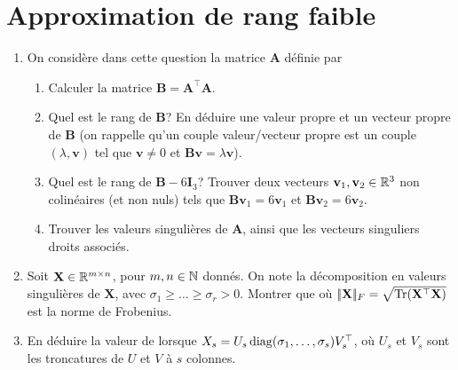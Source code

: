 \section{Approximation de rang faible}
\begin{enumerate}
	
	
	
	\item On considère dans cette question la matrice $\mathbf{A}$ définie par
	\begin{enumerate}
		\item Calculer la matrice $\mathbf{B} = \mathbf{A}^\top \mathbf{A}$.
		\item Quel est le rang de $\mathbf{B}$? En déduire une valeur propre et un vecteur propre de $\mathbf{B}$ (on rappelle qu'un couple valeur/vecteur propre est un couple $(\lambda,\mathbf{v})$ tel que $\mathbf{v}\neq 0$ et $\mathbf{B}\mathbf{v} = \lambda \mathbf{v}$).
		\item Quel est le rang de $\mathbf{B}-6\mathbf{I}_3$? Trouver deux vecteurs $\mathbf{v}_1,\mathbf{v}_2 \in \mathbb{R}^3$ non colinéaires (et non nuls) tels que $\mathbf{B}\mathbf{v}_1=6\mathbf{v}_1$ et $\mathbf{B}\mathbf{v}_2=6\mathbf{v}_2$.
		\item Trouver les valeurs singulières de $\mathbf{A}$, ainsi que les vecteurs singuliers droits associés.
	\end{enumerate}
	
	\item Soit $\mathbf{X} \in \mathbb{R}^{m\times n}$, pour $m,n \in \mathbb{N}$ donnés. On note
	la décomposition en valeurs singulières de $\mathbf{X}$, avec $\sigma_1 \geq \ldots \geq \sigma_r > 0$. Montrer que  où $|\!| \mathbf{X} |\!|_F = \sqrt{\operatorname{Tr}(\mathbf{X}^\top \mathbf{X})}$ est la norme de Frobenius.
	
	
	\item En déduire la valeur de
	lorsque $X_s = U_s \operatorname{diag}(\sigma_1,\ldots,\sigma_s) V_s^\top$, où $U_s$ et $V_s$ sont les troncatures de $U$ et $V$ à $s$ colonnes.
\end{enumerate}


